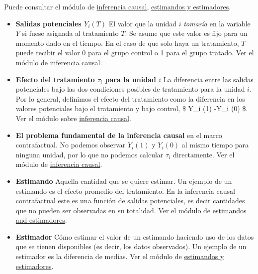\documentclass[12pt,spanish,]{book}
\begin{document}
Puede consultar el módulo de \href{inferencia-causal.html}{inferencia causal}, \href{estimandos-y-estimadores.html}{estimandos y estimadores}.

\begin{itemize}
\item
  \textbf{Salidas potenciales \(Y_i(T)\)} El valor que la unidad \(i\) \emph{tomaría} en la variable \(Y\) si fuese asignada al tratamiento \(T\). Se asume que este valor es fijo para un momento dado en el tiempo. En el caso de que solo haya un tratamiento, \(T\) puede recibir el valor 0 para el grupo control o 1 para el grupo tratado. Ver el módulo de \href{inferencia-causal.html}{inferencia causal}.
\item
  \textbf{Efecto del tratamiento \(\tau_i\) para la unidad \(i\)} La diferencia entre las salidas potenciales bajo las dos condiciones posibles de tratamiento para la unidad \(i\). Por lo general, definimos el efecto del tratamiento como la diferencia en los valores potenciales bajo el tratamiento y bajo control, \$ Y\_i (1) -Y\_i (0) \$. Ver el módulo sobre \href{inferencia-causal.html}{inferencia causal}.
\item
  \textbf{El problema fundamental de la inferencia causal} en el marco contrafactual. No podemos observar \(Y_i(1)\) y \(Y_i(0)\) al mismo tiempo para ninguna unidad, por lo que no podemos calcular \(\tau_i\) directamente. Ver el módulo de \href{inference-causal.html}{inferencia causal}.
\item
  \textbf{Estimando} Aquella cantidad que se quiere estimar. Un ejemplo de un estimando es el efecto promedio del tratamiento. En la inferencia causal contrafactual este es una función de salidas potenciales, es decir cantidades que no pueden ser observadas en su totalidad. Ver el módulo de \href{estimandos-y-estimadores.html}{estimandos and estimadores}.
\item
  \textbf{Estimador} Cómo estimar el valor de un estimando haciendo uso de los datos que se tienen disponibles (es decir, los datos observados). Un ejemplo de un estimador es la diferencia de medias. Ver el módulo de \href{estimandos-y-estimadores.html}{estimandos y estimadores}.


\end{itemize}
\end{document}
